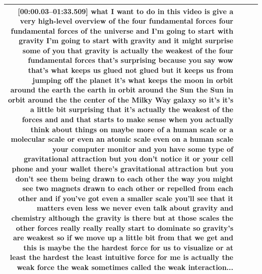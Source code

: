\documentclass[10pt]{article}
\begin{document}
\begin{tiny}
\begin{longtable}{|r|p{0.375in}|p{1.275in}|p{3.5in}|}
                                                                                                                                                                                                                                                                                                                                                                                                                                                                                                                                                     \textbf{[00:00.03--01:33.509]} what I want to do in this video is give a very high-level overview of the four fundamental forces four fundamental forces of the universe and I'm going to start with gravity I'm going to start with gravity and it might surprise some of you that gravity is actually the weakest of the four fundamental forces that's surprising because you say wow that's what keeps us glued not glued but it keeps us from jumping off the planet it's what keeps the moon in orbit around the earth the earth in orbit around the Sun the Sun in orbit around the the center of the Milky Way galaxy so it's it's a little bit surprising that it's actually the weakest of the forces and and that starts to make sense when you actually think about things on maybe more of a human scale or a molecular scale or even an atomic scale even on a human scale your computer monitor and you have some type of gravitational attraction but you don't notice it or your cell phone and your wallet there's gravitational attraction but you don't see them being drawn to each other the way you might see two magnets drawn to each other or repelled from each other and if you've got even a smaller scale you'll see that it matters even less we never even talk about gravity and chemistry although the gravity is there but at those scales the other forces really really really start to dominate so gravity's are weakest so if we move up a little bit from that we get and this is maybe the the hardest force for us to visualize or at least the hardest the least intuitive force for me is actually the weak force the weak sometimes called the weak interaction... \\\hline

\end{longtable}
\end{tiny}
\end{document}
